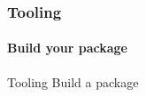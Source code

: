 \documentclass{beamer}
\begin{document}
\begin{frame}
  \frametitle{Tooling}
  \framesubtitle{Build your package}

\end{frame}

\begin{frame}{Tooling}
  Build a package
\end{frame}
\end{document}
